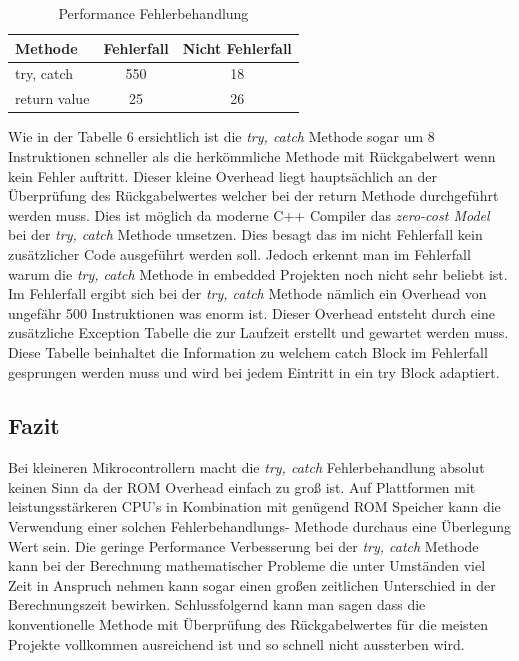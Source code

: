 \documentclass[MES,Master,ngerman]{twbook}%
\begin{document}
\begin{table}[!htb]
	\centering
	\begin{tabular}{| l | c | c |}
		\hline
		\textbf{Methode}   & \textbf{Fehlerfall} & \textbf{Nicht Fehlerfall}   \\ \hline
		try, catch       & 550	& 18		    \\ \hline
		return value           & 25 & 26	    		\\ \hline
		
	\end{tabular}
	
	\caption{Performance Fehlerbehandlung}
	\label{tbl:6}
\end{table}
 Wie in der Tabelle 6 ersichtlich ist die \textit{try, catch} Methode sogar um 8 Instruktionen schneller als die herkömmliche Methode mit Rückgabelwert wenn kein Fehler auftritt. Dieser kleine Overhead liegt hauptsächlich an der Überprüfung des Rückgabelwertes welcher bei der return Methode durchgeführt werden muss. Dies ist möglich da moderne C++ Compiler das \textit{zero-cost Model} bei der \textit{try, catch} Methode umsetzen. Dies besagt das im nicht Fehlerfall kein zusätzlicher Code ausgeführt werden soll. Jedoch erkennt man im Fehlerfall warum die \textit{try, catch} Methode in embedded Projekten noch nicht sehr beliebt ist. Im Fehlerfall ergibt sich bei der \textit{try, catch} Methode nämlich ein Overhead von ungefähr 500 Instruktionen was enorm ist. Dieser Overhead entsteht durch eine zusätzliche Exception Tabelle die zur Laufzeit erstellt und gewartet werden muss. Diese Tabelle beinhaltet die Information zu welchem catch Block im Fehlerfall gesprungen werden muss und wird bei jedem Eintritt in ein try Block adaptiert. 

\newpage
\subsection{Fazit}
Bei kleineren Mikrocontrollern macht die \textit{try, catch} Fehlerbehandlung absolut keinen Sinn da der ROM Overhead einfach zu groß ist. Auf Plattformen mit leistungsstärkeren CPU's in Kombination mit genügend ROM Speicher kann die Verwendung einer solchen Fehlerbehandlungs- Methode durchaus eine Überlegung Wert sein. Die geringe Performance Verbesserung bei der \textit{try, catch} Methode kann bei der Berechnung mathematischer Probleme die unter Umständen viel Zeit in Anspruch nehmen kann sogar einen großen zeitlichen Unterschied in der Berechnungszeit bewirken. Schlussfolgernd kann man sagen dass die konventionelle Methode mit Überprüfung des Rückgabelwertes für die meisten Projekte vollkommen ausreichend ist und so schnell nicht aussterben wird.
\end{document}
